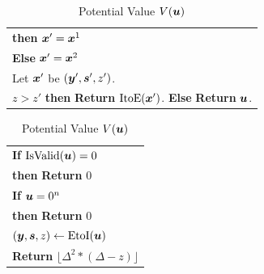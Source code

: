 \begin{table}
\begin{minipage}{0.73\textwidth}
\begin{tabular}{|l|}
\hspace{10pt} {\bf then} $\mbox{\boldmath $x$}'=\mbox{\boldmath $x$}^1$ \\
\hspace{5pt} {\bf Else} $\mbox{\boldmath $x$}'=\mbox{\boldmath $x$}^2$\\
\hspace{0pt}Let $\mbox{\boldmath $x$}'$ be $(\mbox{\boldmath $y$}',\mbox{\boldmath $s$}',z')$. \\
\hspace{0pt}{\bf If} $z>z'$ {\bf then} {\bf Return} $\mbox{ItoE}(\mbox{\boldmath $x$}')$. {\bf Else} {\bf Return} $\mbox{\boldmath $u$}$.\\
\hline
\end{tabular}
\end{minipage}%
\hspace{-1cm}
\begin{minipage}{0.23\textwidth}
\caption{Potential Value $\mbox{$V$}(\mbox{\boldmath $u$})$}\label{tab:F}
\begin{tabular}{|l|}
\hline
\hspace{0pt} {\bf If} $\mbox{IsValid}(\mbox{\boldmath $u$})=0$ \\
\hspace{5pt} {\bf then} {\bf Return} $0$\\
\hspace{0pt} {\bf If} $\mbox{\boldmath $u$}=0^n$\\
\hspace{5pt}  {\bf then} {\bf Return} $0$\\
\hspace{0pt} $(\mbox{\boldmath $y$},\mbox{\boldmath $s$},z) \leftarrow \mbox{EtoI}(\mbox{\boldmath $u$})$\\
\hspace{0pt} {\bf Return} $\lfloor \Delta^2*(\Delta -z)\rfloor$\\
\hline
\end{tabular}
\end{minipage}
\end{table}




